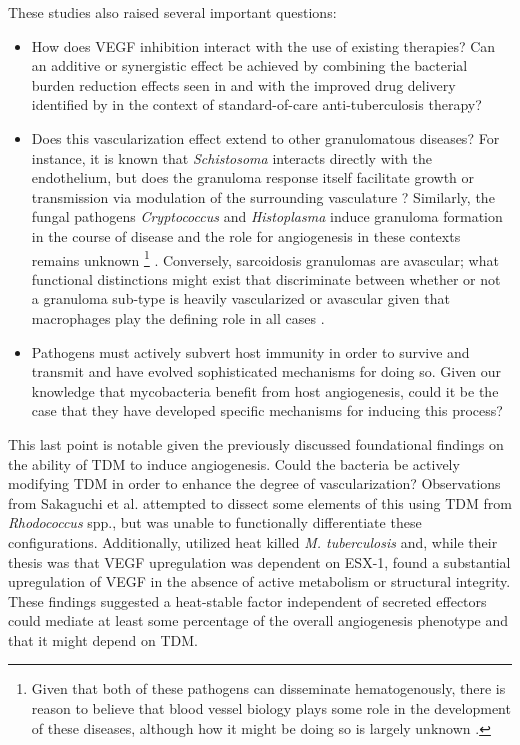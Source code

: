 These studies also raised several important questions:

\begin{itemize}
\item How does VEGF inhibition interact with the use of existing therapies? Can an additive or synergistic effect be achieved by combining the bacterial burden reduction effects seen in \citet{Oehlers2015} and \citet{Polena2016} with the improved drug delivery identified by \citet{Datta2015} in the context of standard\hyp{}of\hyp{}care anti\hyp{}tuberculosis therapy?
\item Does this vascularization effect extend to other granulomatous diseases? For instance, it is known that \textit{Schistosoma} interacts directly with the endothelium, but does the granuloma response itself facilitate growth or transmission via modulation of the surrounding vasculature \citep{Chaves1966, Shariati2011, Pereira2013}? Similarly, the fungal pathogens \textit{Cryptococcus} and \textit{Histoplasma} induce granuloma formation in the course of disease and the role for angiogenesis in these contexts remains unknown \footnote{Given that both of these pathogens can disseminate hematogenously, there is reason to believe that blood vessel biology plays some role in the development of these diseases, although how it might be doing so is largely unknown \citep{Kauffman2007}.} \citep{Coenjaerts2004, Martidis1999}. Conversely, sarcoidosis granulomas are avascular; what functional distinctions might exist that discriminate between whether or not a granuloma sub\hyp{}type is heavily vascularized or avascular given that macrophages play the defining role in all cases \citep{Kambouchner2011}.
\item Pathogens must actively subvert host immunity in order to survive and transmit and have evolved sophisticated mechanisms for doing so. Given our knowledge that mycobacteria benefit from host angiogenesis, could it be the case that they have developed specific mechanisms for inducing this process? 
\end{itemize}

This last point is notable given the previously discussed foundational findings on the ability of TDM to induce angiogenesis. Could the bacteria be actively modifying TDM in order to enhance the degree of vascularization? Observations from Sakaguchi et al. attempted to dissect some elements of this using TDM from \textit{Rhodococcus} spp., but was unable to functionally differentiate these configurations. Additionally, \citeauthor{Polena2016} utilized heat killed \textit{M. tuberculosis} and, while their thesis was that VEGF upregulation was dependent on ESX\hyp{}1, found a substantial upregulation of VEGF in the absence of active metabolism or structural integrity. These findings suggested a heat\hyp{}stable factor independent of secreted effectors could mediate at least some percentage of the overall angiogenesis phenotype and that it might depend on TDM.

